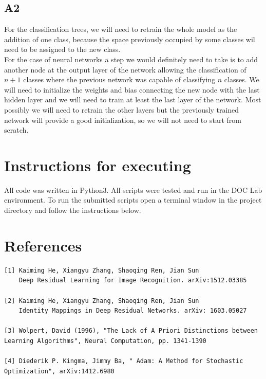 \documentclass[12pt,twoside]{article}
\begin{document}
\subsection{A2}

For the classification trees, we will need to retrain the whole model as the addition of one class, because the space previously occupied by some classes wil need to be assigned to the new class.\\

For the case of neural networks a step we would definitely need to take is to add another node at the output layer of the network allowing the classification of $n+1$ classes where the previous network was capable of classifying $n$ classes. We will need to initialize the weights and bias connecting the new node with the last hidden layer and we will need to train at least the last layer of the network. Most possibly we will need to retrain the other layers but the previously trained network will provide a good initialization, so we will not need to start from scratch.


\newpage
\section{Instructions for executing}
All code was written in Python3. All scripts were tested and run in the DOC Lab environment. To run the submitted scripts open a terminal window in the project directory and follow the instructions below.\\

\section{References}

\begin{verbatim}
[1] Kaiming He, Xiangyu Zhang, Shaoqing Ren, Jian Sun
    Deep Residual Learning for Image Recognition. arXiv:1512.03385

[2] Kaiming He, Xiangyu Zhang, Shaoqing Ren, Jian Sun
    Identity Mappings in Deep Residual Networks. arXiv: 1603.05027
    
[3] Wolpert, David (1996), "The Lack of A Priori Distinctions between Learning Algorithms", Neural Computation, pp. 1341-1390

[4] Diederik P. Kingma, Jimmy Ba, " Adam: A Method for Stochastic Optimization", arXiv:1412.6980
\end{verbatim}
\end{document}
